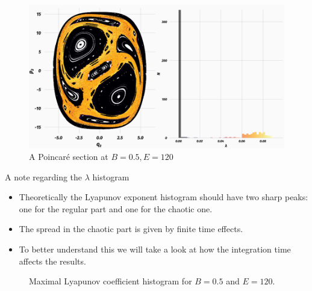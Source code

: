 \documentclass{beamer}
\begin{document}

\begin{frame}
	\begin{figure}
		\includegraphics[width=\textwidth]{poincare}
		\caption{A Poincaré section at \(B=0.5, E=120\)}
	\end{figure}
\end{frame}


\begin{frame}{A note regarding the \(\lambda\) histogram}
	\begin{itemize}
		\item Theoretically the Lyapunov exponent histogram should
		have two sharp peaks: one for the regular part and one for
		the chaotic one.
		\item The spread in the chaotic part is given by finite time
		effects.
		\item To better understand this we will take a look at how
		the integration time affects the results.
	\end{itemize}
\end{frame}


\begin{frame}
	\begin{figure}
		
		\caption{Maximal Lyapunov coefficient histogram for \(B=0.5\)
		and \(E=120\).}
	\end{figure}
\end{frame}

\end{document}
